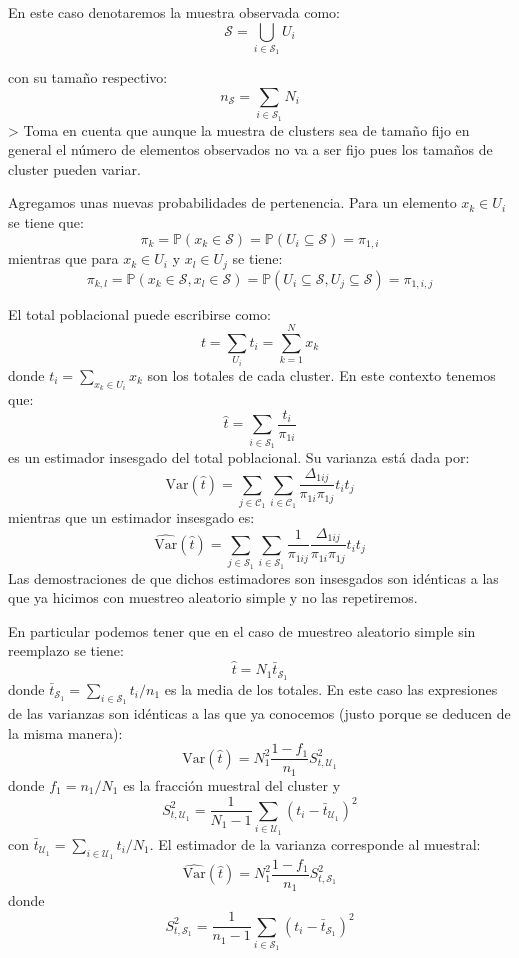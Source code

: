 \documentclass[
]{book}
\begin{document}
En este caso denotaremos la muestra observada como:
\[
\mathcal{S} = \bigcup_{i \in \mathcal{S}_1} U_i
\]

con su tamaño respectivo:
\[
n_{\mathcal{S}} = \sum\limits_{i \in \mathcal{S}_1} N_i
\]
\textgreater{} Toma en cuenta que aunque la muestra de clusters sea de tamaño fijo en general el número de elementos observados no va a ser fijo pues los tamaños de cluster pueden variar.

Agregamos unas nuevas probabilidades de pertenencia. Para un elemento \(x_k \in U_i\) se tiene que:
\[
\pi_{k} = \mathbb{P}(x_k \in \mathcal{S}) = \mathbb{P}(U_i \subseteq \mathcal{S}) = \pi_{1,i}
\]
mientras que para \(x_k \in U_i\) y \(x_l\in U_j\) se tiene:
\[
\pi_{k,l} = \mathbb{P}(x_k  \in \mathcal{S},x_l  \in \mathcal{S}) = \mathbb{P}(U_i \subseteq \mathcal{S}, U_j \subseteq \mathcal{S}) = \pi_{1,i,j}
\]

El total poblacional puede escribirse como:
\[
t = \sum_{U_i} t_i = \sum_{k = 1}^N x_k 
\]
donde \(t_i = \sum_{x_k \in U_i} x_k\) son los totales de cada cluster. En este contexto tenemos que:
\[
\hat{t} = \sum\limits_{i \in \mathcal{S}_1} \dfrac{t_i}{\pi_{1i}}
\]
es un estimador insesgado del total poblacional. Su varianza está dada por:
\[
\textrm{Var}(\hat{t}) = \sum\limits_{j \in \mathcal{C}_1}\sum\limits_{i \in \mathcal{C}_1} \dfrac{\Delta_{1ij}}{\pi_{1i}\pi_{1j}} t_i t_j
\]
mientras que un estimador insesgado es:
\[
\widehat{\textrm{Var}}(\hat{t}) = \sum\limits_{j \in \mathcal{S}_1}\sum\limits_{i \in \mathcal{S}_1}\dfrac{1}{\pi_{1ij}} \dfrac{\Delta_{1ij}}{\pi_{1i}\pi_{1j}} t_i t_j
\]
Las demostraciones de que dichos estimadores son insesgados son idénticas a las que ya hicimos con muestreo aleatorio simple y no las repetiremos.

En particular podemos tener que en el caso de muestreo aleatorio simple sin reemplazo se tiene:
\[
\hat{t} = N_1 \bar{t}_{\mathcal{S}_1}
\]
donde \(\bar{t}_{\mathcal{S}_1} = \sum_{i \in \mathcal{S}_1} t_i / n_1\) es la media de los totales. En este caso las expresiones de las varianzas son idénticas a las que ya conocemos (justo porque se deducen de la misma manera):
\[
\textrm{Var}(\hat{t}) = N_1^2 \dfrac{1 - f_1}{n_1}S^2_{t,\mathcal{U}_1}
\]
donde \(f_1 = n_1/N_1\) es la fracción muestral del cluster y
\[
S^2_{t,\mathcal{U}_1} = \dfrac{1}{N_1 - 1} \sum_{i\in\mathcal{U}_1}(t_i - \bar{t}_{\mathcal{U}_1})^2
\]
con \(\bar{t}_{\mathcal{U}_1} = \sum\limits_{i \in \mathcal{U}_1} t_i / N_1\). El estimador de la varianza corresponde al muestral:
\[
\widehat{\textrm{Var}}(\hat{t}) =  N_1^2 \dfrac{1 - f_1}{n_1}S^2_{t,\mathcal{S}_1}
\]
donde
\[
S^2_{t,\mathcal{S}_1} = \dfrac{1}{n_1 - 1} \sum_{i\in\mathcal{S}_1}(t_i - \bar{t}_{\mathcal{S}_1})^2
\]
\end{document}
